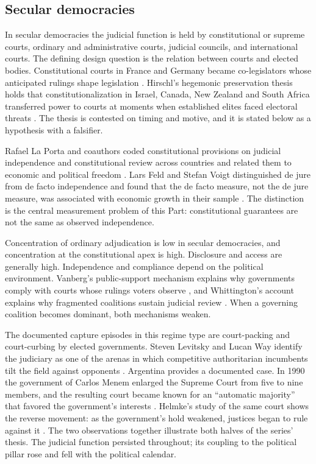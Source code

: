 \documentclass[11pt,letterpaper]{article}
\theoremstyle{definition}
\theoremstyle{remark}
\begin{document}
\subsection{Secular democracies}

In secular democracies the judicial function is held by constitutional or supreme courts, ordinary and administrative courts, judicial councils, and international courts. The defining design question is the relation between courts and elected bodies. Constitutional courts in France and Germany became co-legislators whose anticipated rulings shape legislation \citep{stonesweet2000}. Hirschl's hegemonic preservation thesis holds that constitutionalization in Israel, Canada, New Zealand and South Africa transferred power to courts at moments when established elites faced electoral threats \citep{hirschl2001,hirschl2004}. The thesis is contested on timing and motive, and it is stated below as a hypothesis with a falsifier.

Rafael La Porta and coauthors coded constitutional provisions on judicial independence and constitutional review across countries and related them to economic and political freedom \citep{laporta2004}. Lars Feld and Stefan Voigt distinguished de jure from de facto independence and found that the de facto measure, not the de jure measure, was associated with economic growth in their sample \citep{feld2003}. The distinction is the central measurement problem of this Part: constitutional guarantees are not the same as observed independence.

Concentration of ordinary adjudication is low in secular democracies, and concentration at the constitutional apex is high. Disclosure and access are generally high. Independence and compliance depend on the political environment. Vanberg's public-support mechanism explains why governments comply with courts whose rulings voters observe \citep{vanberg2005}, and Whittington's account explains why fragmented coalitions sustain judicial review \citep{whittington2005}. When a governing coalition becomes dominant, both mechanisms weaken.

The documented capture episodes in this regime type are court-packing and court-curbing by elected governments. Steven Levitsky and Lucan Way identify the judiciary as one of the arenas in which competitive authoritarian incumbents tilt the field against opponents \citep{levitsky2010}. Argentina provides a documented case. In 1990 the government of Carlos Menem enlarged the Supreme Court from five to nine members, and the resulting court became known for an ``automatic majority'' that favored the government's interests \citep{hevia2008}. Helmke's study of the same court shows the reverse movement: as the government's hold weakened, justices began to rule against it \citep{helmke2005}. The two observations together illustrate both halves of the series' thesis. The judicial function persisted throughout; its coupling to the political pillar rose and fell with the political calendar.
\end{document}
